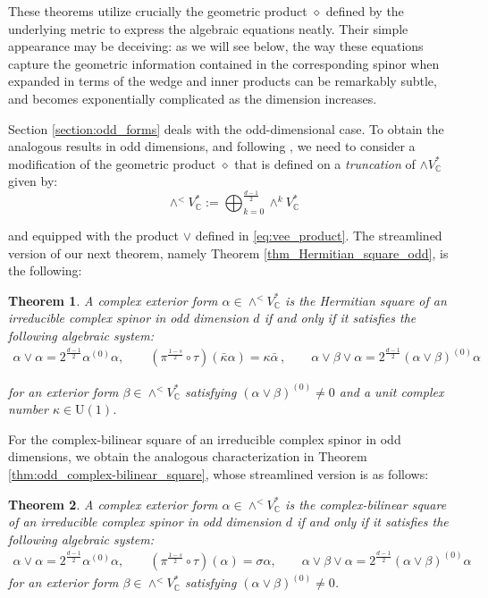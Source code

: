 \documentclass[10pt,a4paper,twoside,reqno]{amsart}
\theoremstyle{plain}
\newtheorem{thm}{Theorem}[section]
\theoremstyle{definition}
\theoremstyle{remark}
\def\C{\mathbb{C}}
\def\U{\mathrm{U}}
\begin{document}
\noindent
These theorems utilize crucially the geometric product $\diamond$ defined by the underlying metric to express the algebraic equations neatly. Their simple appearance may be deceiving: as we will see below, the way these equations capture the geometric information contained in the corresponding spinor when expanded in terms of the wedge and inner products can be remarkably subtle, and becomes exponentially complicated as the dimension increases.\medskip

Section \ref{section:odd_forms} deals with the odd-dimensional case. To obtain the analogous results in odd dimensions, and following \cite{LBC13,LB13,LBC16}, we need to consider a modification of the geometric product $\diamond$ that is defined on a \emph{truncation} of $\wedge V^{\ast}_\C$ given by: 
\begin{equation*}
\wedge^<V^*_\C:=\bigoplus_{k=0}^{\frac{d-1}{2}}\wedge^kV^*_\C    
\end{equation*}

\noindent
and equipped with the product $\vee$ defined in \eqref{eq:vee_product}. The streamlined version of our next theorem, namely Theorem \ref{thm_Hermitian_square_odd}, is the following:

\begin{thm} 
A complex exterior form $\alpha\in\wedge^< V^*_\C$ is the Hermitian square of an irreducible complex spinor in odd dimension $d$ if and only if it satisfies the following algebraic system:    
\begin{eqnarray*}
\alpha\vee\alpha = 2^{\frac{d-1}{2}}\alpha^{(0)}\alpha, \qquad(\pi^{\frac{1-s}{2}}\circ\tau)(\bar\kappa\alpha) = \kappa \bar{\alpha}\, , \qquad\alpha\vee\beta\vee\alpha=2^{\frac{d-1}{2}}(\alpha\vee\beta)^{(0)}\alpha
\end{eqnarray*}

\noindent
for an exterior form $\beta \in \wedge^< V^*_\C$ satisfying $(\alpha\vee\beta)^{(0)}\neq0$ and a unit complex number $\kappa \in \U(1)$.  
\end{thm}

\noindent
For the complex-bilinear square of an irreducible complex spinor in odd dimensions, we obtain the analogous characterization in Theorem \ref{thm:odd_complex-bilinear_square}, whose streamlined version is as follows:

\begin{thm}
A complex exterior form $\alpha\in\wedge^< V^*_\C$ is the complex-bilinear square of an irreducible complex spinor in odd dimension $d$ if and only if it satisfies the following algebraic system:    
\begin{eqnarray*}
\alpha\vee\alpha=2^{\frac{d-1}{2}}\alpha^{(0)}\alpha,\qquad(\pi^{\frac{1-s}{2}}\circ\tau)(\alpha)=\sigma\alpha,\qquad\alpha\vee\beta\vee\alpha=2^{\frac{d-1}{2}}(\alpha\vee\beta)^{(0)}\alpha   
\end{eqnarray*}
for an exterior form $\beta\in\wedge^<V^*_\C$ satisfying $(\alpha\vee\beta)^{(0)}\neq 0$.
\end{thm}
\end{document}

